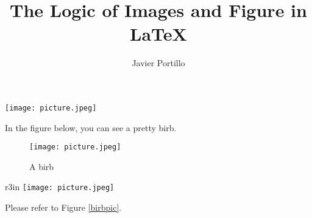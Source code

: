 \documentclass{article}
\author{Javier Portillo}
\title{The Logic of Images and Figure in {\LaTeX}}
\begin{document}
\maketitle

\begin{center}
	\texttt{[image: picture.jpeg]}
\end{center}

\blindtext

\blindtext

In the figure below, you can see a pretty birb.

\begin{figure}[h]
  \centering
  \texttt{[image: picture.jpeg]}
  \caption{A birb}
\end{figure}

\blindtext
\blindtext
\blindtext

\begin{wrapfigure}{r}{3in}
  \centering
	\texttt{[image: picture.jpeg]}
  \caption{another same birb}
  \label{birbpic}
\end{wrapfigure}

Please refer to Figure \ref{birbpic}.

\blindtext
\blindtext
\end{document}
